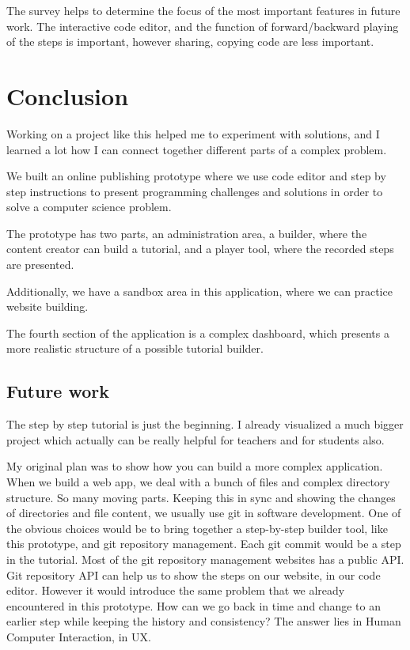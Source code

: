 \documentclass[12pt, a4paper, oneside, openright, medskipamount]{report}
\begin{document}
The survey helps to determine the focus of the most important features in future work. The interactive code editor, and the function of forward/backward playing of the steps is important, however sharing, copying code are less important.

\section{Conclusion}

Working on a project like this helped me to experiment with solutions, and I learned a lot how I can connect together different parts of a complex problem.

We built an online publishing prototype where we use code editor and step by step instructions to present programming challenges and solutions in order to solve a computer science problem.

The prototype has two parts, an administration area, a builder, where the content creator can build a tutorial, and a player tool, where the recorded steps are presented.

Additionally, we have a sandbox area in this application, where we can practice website building.

The fourth section of the application is a complex dashboard, which presents a more realistic structure of a possible tutorial builder.

\subsection{Future work}

The step by step tutorial is just the beginning. I already visualized a much bigger project which actually can be really helpful for teachers and for students also.

My original plan was to show how you can build a more complex application. When we build a web app, we deal with a bunch of files and complex directory structure. So many moving parts. Keeping this in sync and showing the changes of directories and file content, we usually use git in software development. One of the obvious choices would be to bring together a step-by-step builder tool, like this prototype, and git repository management. Each git commit would be a step in the tutorial. Most of the git repository management websites has a public API. Git repository API can help us to show the steps on our website, in our code editor. However it would introduce the same problem that we already encountered in this prototype. How can we go back in time and change to an earlier step while keeping the history and consistency? The answer lies in Human Computer Interaction, in UX.
\end{document}
